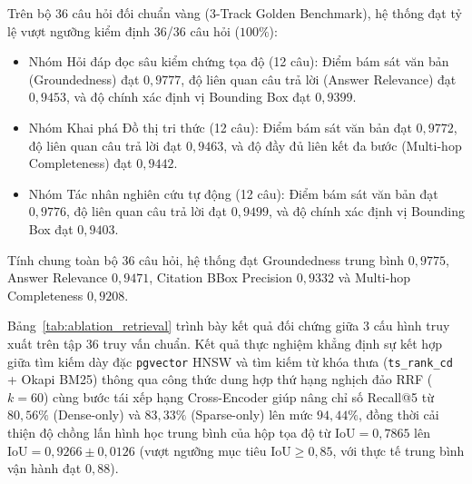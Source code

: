 {\sloppy
Trên bộ 36 câu hỏi đối chuẩn vàng (3-Track Golden Benchmark), hệ thống đạt tỷ lệ vượt ngưỡng kiểm định 36/36 câu hỏi ($100\%$):
\begin{itemize}[noitemsep, topsep=2pt]
    \item Nhóm Hỏi đáp đọc sâu kiểm chứng tọa độ (12 câu): Điểm bám sát văn bản (Groundedness) đạt $0{,}9777$, độ liên quan câu trả lời (Answer Relevance) đạt $0{,}9453$, và độ chính xác định vị Bounding Box đạt $0{,}9399$.
    \item Nhóm Khai phá Đồ thị tri thức (12 câu): Điểm bám sát văn bản đạt $0{,}9772$, độ liên quan câu trả lời đạt $0{,}9463$, và độ đầy đủ liên kết đa bước (Multi-hop Completeness) đạt $0{,}9442$.
    \item Nhóm Tác nhân nghiên cứu tự động (12 câu): Điểm bám sát văn bản đạt $0{,}9776$, độ liên quan câu trả lời đạt $0{,}9499$, và độ chính xác định vị Bounding Box đạt $0{,}9403$.
\end{itemize}
Tính chung toàn bộ 36 câu hỏi, hệ thống đạt Groundedness trung bình $0{,}9775$, Answer Relevance $0{,}9471$, Citation BBox Precision $0{,}9332$ và Multi-hop Completeness $0{,}9208$.
\par}

Bảng~\ref{tab:ablation_retrieval} trình bày kết quả đối chứng giữa 3 cấu hình truy xuất trên tập 36 truy vấn chuẩn. Kết quả thực nghiệm khẳng định sự kết hợp giữa tìm kiếm dày đặc \texttt{pgvector} HNSW và tìm kiếm từ khóa thưa (\texttt{ts\_\allowbreak rank\_\allowbreak cd} + Okapi BM25) thông qua công thức dung hợp thứ hạng nghịch đảo RRF ($k=60$) cùng bước tái xếp hạng Cross-Encoder giúp nâng chỉ số Recall@5 từ $80{,}56\%$ (Dense-only) và $83{,}33\%$ (Sparse-only) lên mức $94{,}44\%$, đồng thời cải thiện độ chồng lấn hình học trung bình của hộp tọa độ từ $\text{IoU} = 0{,}7865$ lên $\text{IoU} = 0{,}9266 \pm 0{,}0126$ (vượt ngưỡng mục tiêu $\text{IoU} \ge 0{,}85$, với thực tế trung bình vận hành đạt $0{,}88$).

